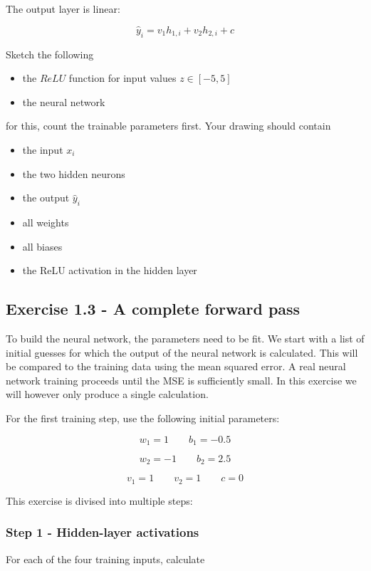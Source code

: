 \documentclass{course_sheet}
\begin{document}
The output layer is linear:

\[
\hat y_i=v_1h_{1,i}+v_2h_{2,i}+c
\]

Sketch the following

\begin{itemize}
\item
the $ReLU$ function for input values $z\in[-5,5]$

\item
the neural network

\end{itemize}
for this, count the trainable parameters first. Your drawing should contain

\begin{itemize}
\item
the input $x_i$

\item
the two hidden neurons

\item
the output $\hat y_i$

\item
all weights

\item
all biases

\item
the ReLU activation in the hidden layer

\end{itemize}
\subsection*{Exercise 1.3 - A complete forward pass}
To build the neural network, the parameters need to be fit. We start with a list of initial guesses for which the output of the neural network is calculated. This will be compared to the training data using the mean squared error. A real neural network training proceeds until the MSE is sufficiently small. In this exercise we will however only produce a single calculation.

For the first training step, use the following initial parameters:

\[
w_1=1
\qquad
b_1=-0.5
\]

\[
w_2=-1
\qquad
b_2=2.5
\]

\[
v_1=1
\qquad
v_2=1
\qquad
c=0
\]

This exercise is divised into multiple steps:

\subsubsection*{Step 1 - Hidden-layer activations}
For each of the four training inputs, calculate
\end{document}
